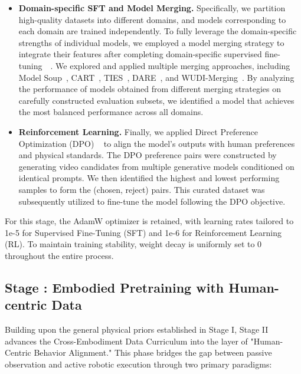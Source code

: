 \begin{itemize}
\item \textbf {Domain-specific SFT and Model Merging.} Specifically, we partition high-quality datasets into different domains, and models corresponding to each domain are trained independently. To fully leverage the domain-specific strengths of individual models, we employed a model merging strategy to integrate their features after completing domain-specific supervised fine-tuning~\citep{tang2025fusionbench}~\citep{yang2026ModelMergingSurvey}. We explored and applied multiple merging approaches, including Model Soup~\citep{wortsman2022modelsoupsaveragingweights}, CART~\citep{choi2024revisiting}, TIES~\citep{yadav2023tiesmergingresolvinginterferencemerging}, DARE~\citep{yu2024languagemodelssupermario}, and WUDI-Merging~\citep{cheng2025startedinterferenceendit}. By analyzing the performance of models obtained from different merging strategies on carefully constructed evaluation subsets, we identified a model that achieves the most balanced performance across all domains. 


\item \textbf {Reinforcement Learning.}
Finally, we applied Direct Preference Optimization (DPO) ~\citep{wallace2023diffusion,rafailov2024directpreferenceoptimizationlanguage,liu2025videodpo} to align the model’s outputs with human preferences and physical standards. The DPO preference pairs were constructed by generating video candidates from multiple generative models conditioned on identical prompts. We then identified the highest and lowest performing samples to form the (chosen, reject) pairs. This curated dataset was subsequently utilized to fine-tune the model following the DPO objective.

\end{itemize}

For this stage, the AdamW optimizer is retained, with learning rates tailored to 1e-5 for Supervised Fine-Tuning (SFT) and 1e-6 for Reinforcement Learning (RL). To maintain training stability, weight decay is uniformly set to 0 throughout the entire process.


\subsection{Stage \uppercase\expandafter{}: Embodied Pretraining with Human-centric Data}

Building upon the general physical priors established in Stage I, Stage II advances the Cross-Embodiment Data Curriculum into the layer of "Human-Centric Behavior Alignment." This phase bridges the gap between passive observation and active robotic execution through two primary paradigms:

